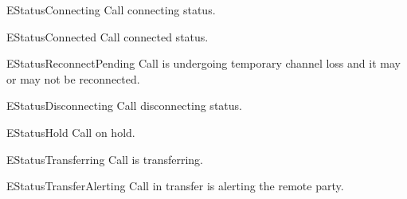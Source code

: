 \begin{datadesc}{EStatusConnecting}
Call connecting status.
\end{datadesc}

\begin{datadesc}{EStatusConnected}
Call connected status.
\end{datadesc}

\begin{datadesc}{EStatusReconnectPending}
Call is undergoing temporary channel loss and it may or may not be reconnected.
\end{datadesc}

\begin{datadesc}{EStatusDisconnecting}
Call disconnecting status.
\end{datadesc}

\begin{datadesc}{EStatusHold}
Call on hold.
\end{datadesc}

\begin{datadesc}{EStatusTransferring}
Call is transferring.
\end{datadesc}

\begin{datadesc}{EStatusTransferAlerting}
Call in transfer is alerting the remote party.
\end{datadesc}
